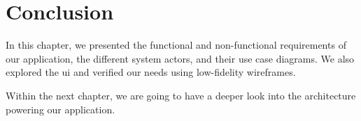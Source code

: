 
\section{Conclusion}

In this chapter, we presented the functional and non-functional requirements of our application, the different system actors, and their use case diagrams.
We also explored the \acrlong{ui} and verified our needs using low-fidelity wireframes.

Within the next chapter, we are going to have a deeper look into the architecture powering our application.